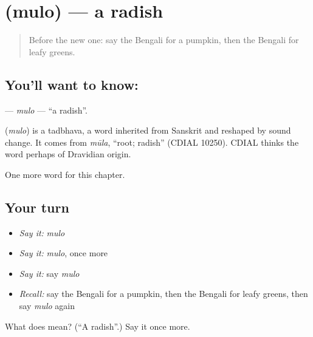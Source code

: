 \section[\texorpdfstring{\bn{মুলো} (mulo)}{মুলো (mulo)}]{ (mulo) — a radish}

\label{lesson:BN-C117-mulo}



\begin{quote}
Before the new one: say the Bengali for a pumpkin, then the Bengali for leafy greens.
\end{quote}

\subsection*{You'll want to know: }
\textbf{} — \emph{mulo} — \textquotedblleft{}a radish\textquotedblright{}.

\begin{cousinweb}
\textbf{} (\emph{mulo}) is a tadbhava, a word inherited from Sanskrit and reshaped by sound change. It comes from \emph{mūla}, \textquotedblleft{}root; radish\textquotedblright{} (CDIAL 10250). CDIAL thinks the word perhaps of Dravidian origin.
\end{cousinweb}

\begin{grammarlens}[title={What you've built}]
One more word for this chapter.
\end{grammarlens}

\subsection*{Your turn}
\begin{itemize}
\raggedright
  \item \emph{Say it:} \emph{mulo}
  \item \emph{Say it:} \emph{mulo}, once more
  \item \emph{Say it:} say \emph{mulo}
  \item \emph{Recall:} say the Bengali for a pumpkin, then the Bengali for leafy greens, then say \emph{mulo} again
\end{itemize}

\begin{tcolorbox}[breakable,colback=teal!4,colframe=teal!35!black,title={Before you move on}]
What does  mean? (\textquotedblleft{}A radish\textquotedblright{}.) Say it once more.
\end{tcolorbox}
